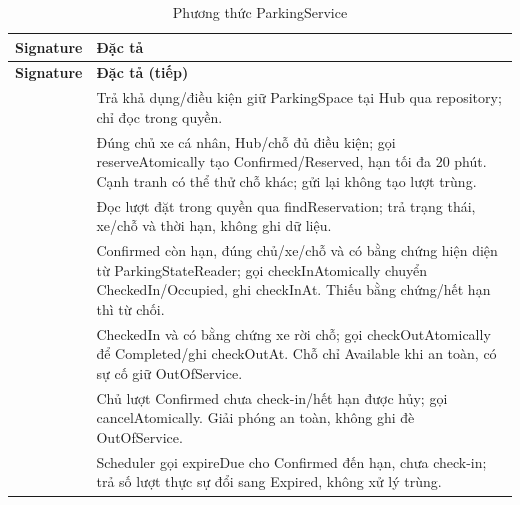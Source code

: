 \begin{longtable}{|L{58mm}|L{81mm}|}
\caption{Phương thức ParkingService}\\\hline
\textbf{Signature} & \textbf{Đặc tả}\\\hline
\endfirsthead
\hline\textbf{Signature} & \textbf{Đặc tả (tiếp)}\\\hline\endhead
{} & Trả khả dụng/điều kiện giữ ParkingSpace tại Hub qua repository; chỉ đọc trong quyền.\\\hline
{} & Đúng chủ xe cá nhân, Hub/chỗ đủ điều kiện; gọi reserveAtomically tạo Confirmed/Reserved, hạn tối đa 20 phút. Cạnh tranh có thể thử chỗ khác; gửi lại không tạo lượt trùng.\\\hline
{} & Đọc lượt đặt trong quyền qua findReservation; trả trạng thái, xe/chỗ và thời hạn, không ghi dữ liệu.\\\hline
{} & Confirmed còn hạn, đúng chủ/xe/chỗ và có bằng chứng hiện diện từ ParkingStateReader; gọi checkInAtomically chuyển CheckedIn/Occupied, ghi checkInAt. Thiếu bằng chứng/hết hạn thì từ chối.\\\hline
{} & CheckedIn và có bằng chứng xe rời chỗ; gọi checkOutAtomically để Completed/ghi checkOutAt. Chỗ chỉ Available khi an toàn, có sự cố giữ OutOfService.\\\hline
{} & Chủ lượt Confirmed chưa check-in/hết hạn được hủy; gọi cancelAtomically. Giải phóng an toàn, không ghi đè OutOfService.\\\hline
{} & Scheduler gọi expireDue cho Confirmed đến hạn, chưa check-in; trả số lượt thực sự đổi sang Expired, không xử lý trùng.\\\hline
\end{longtable}

